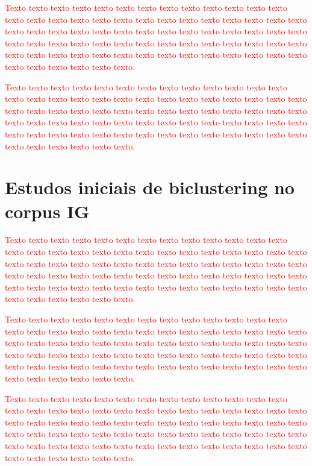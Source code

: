 \documentclass[normaltoc, espacoumemeio, pnumromarab,ruledheader]{abnt}
\begin{document}
\textcolor{red}{Texto texto texto texto texto texto texto texto texto texto texto texto texto texto texto texto texto texto texto texto texto texto texto texto texto texto texto texto texto texto texto texto texto texto texto texto texto texto texto texto texto texto texto texto texto texto texto texto texto texto texto texto texto texto texto texto texto texto texto texto texto texto texto texto texto texto texto texto texto texto texto texto texto texto texto.}

\textcolor{red}{Texto texto texto texto texto texto texto texto texto texto texto texto texto texto texto texto texto texto texto texto texto texto texto texto texto texto texto texto texto texto texto texto texto texto texto texto texto texto texto texto texto texto texto texto texto texto texto texto texto texto texto texto texto texto texto texto texto texto texto texto texto texto texto texto texto texto texto texto texto texto texto texto texto texto texto.}

\section{Estudos iniciais de biclustering no corpus IG}

\textcolor{red}{Texto texto texto texto texto texto texto texto texto texto texto texto texto texto texto texto texto texto texto texto texto texto texto texto texto texto texto texto texto texto texto texto texto texto texto texto texto texto texto texto texto texto texto texto texto texto texto texto texto texto texto texto texto texto texto texto texto texto texto texto texto texto texto texto texto texto texto texto texto texto texto texto texto texto texto.}

\textcolor{red}{Texto texto texto texto texto texto texto texto texto texto texto texto texto texto texto texto texto texto texto texto texto texto texto texto texto texto texto texto texto texto texto texto texto texto texto texto texto texto texto texto texto texto texto texto texto texto texto texto texto texto texto texto texto texto texto texto texto texto texto texto texto texto texto texto texto texto texto texto texto texto texto texto texto texto texto.}

\textcolor{red}{Texto texto texto texto texto texto texto texto texto texto texto texto texto texto texto texto texto texto texto texto texto texto texto texto texto texto texto texto texto texto texto texto texto texto texto texto texto texto texto texto texto texto texto texto texto texto texto texto texto texto texto texto texto texto texto texto texto texto texto texto texto texto texto texto texto texto texto texto texto texto texto texto texto texto texto.}
\end{document}
